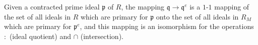 Given a contracted prime ideal $\mathfrak{p}$ of $R$, the mapping $\mathfrak{q} \to \mathfrak{q}^e$ is a $1$-$1$ mapping of the set of all ideals in $R$ which are primary for $\mathfrak{p}$ onto the set of all ideals in $R_M$ which are primary for $\mathfrak{p}^e$, and this mapping is an isomorphism for the operations $:$ (ideal quotient) and $\cap$ (intersection).
